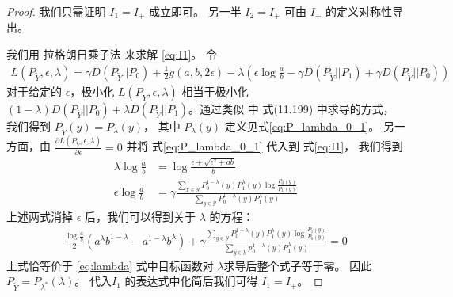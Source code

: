     \begin{proof}
        我们只需证明 $I_1=I_+$ 成立即可。
另一半 $I_2=I_+$ 可由 $I_+$ 的定义对称性导出。

我们用 拉格朗日乘子法 来求解 \eqref{eq:I1}。
令
\begin{align*}
L(P_{\widetilde{Y}},\epsilon, \lambda)
=\gamma D(P_{\widetilde{Y}}|| P_0)+
\frac{1}{2} g(a,b, 2\epsilon)
- \lambda(\epsilon \log\frac{a}{b}-\gamma
D(P_{\widetilde{Y}} || P_1) + \gamma D(P_{\widetilde{Y}} || P_0))
\end{align*}
对于给定的 $\epsilon$，极小化 $L(P_{\widetilde{Y}},\epsilon, \lambda)$
相当于极小化
$(1-\lambda)D(P_{\widetilde{Y}} || P_0) +
\lambda D(P_{\widetilde{Y}} || P_1) $。通过类似
\citet{cover1999elements} 中 式(11.199) 中求导的方式，
我们得到 $P_{\widetilde{Y}}(y) = P_{\lambda}(y)$，
其中 $P_{\lambda}(y)$ 定义见式\eqref{eq:P_lambda_0_1}。
另一方面，由 $\frac{\partial L(P_{\widetilde{Y}},\epsilon, \lambda)}{\partial \epsilon}=0$
并将 式\eqref{eq:P_lambda_0_1}
代入到 式\eqref{eq:I1}， 我们得到
\begin{align*}
    \lambda \log \frac{a}{b}
    & = \log \frac{\epsilon + \sqrt{\epsilon^2+ab}}{b} \\
    \epsilon \log \frac{a}{b}
    & = \gamma\frac{\sum_{Y \in \mathcal{Y}}P_0^{1-\lambda}(y) P_1^{\lambda} (y)
    \log \frac{P_0(y)}{P_1(y)}}{\sum_{y \in \mathcal{Y}}
    P_0^{1-\lambda}(y) P_1^{\lambda} (y)}
\end{align*}
上述两式消掉 $\epsilon$ 后，我们可以得到关于
$\lambda$ 的方程：
\begin{align*}
    \frac{\log\frac{a}{b}}{2}
    (a^{\lambda} b^{1-\lambda}
    -a^{1-\lambda} b^{\lambda})
    + \gamma \frac{\sum_{y \in \mathcal{Y}}
    P_0^{1-\lambda}(y) P_1^{\lambda}(y)
    \log \frac{P_1(y)}{P_0(y)}}
    {\sum_{y \in \mathcal{Y}}p_0^{1-\lambda}(y)
    P_1^{\lambda} (y)}
    =0
\end{align*}
上式恰等价于 \eqref{eq:lambda} 式中目标函数对 $\lambda$求导后整个式子等于零。
因此$P_{\widetilde{Y}}=P_{\lambda^*}(\lambda)$。
代入$I_1$ 的表达式中化简后我们可得
$I_1 = I_+$。
\end{proof}
